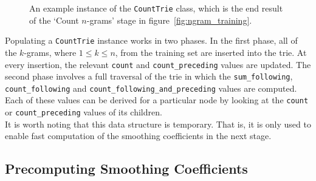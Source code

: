 \documentclass[a4paper, 12pt]{report}
\newcommand{\ttt}[1]{\texttt{#1}}
\newcommand{\tit}[1]{\textit{#1}}
\begin{document}
\begin{figure}[h]
\caption{An example instance of the \ttt{CountTrie} class, which is the end result of the `Count $n$-grams' stage in figure~\ref{fig:ngram_training}.}
\label{fig:count_trie}
\end{figure}

Populating a \ttt{CountTrie} instance works in two phases. In the first phase, all of the $k$-grams, where $1 \leq k \leq n$, from the training set are inserted into the trie. At every insertion, the relevant \ttt{count} and \ttt{count\_preceding} values are updated. The second phase involves a full traversal of the trie in which the \ttt{sum\_following}, \ttt{count\_following} and \ttt{count\_following\_and\_preceding} values are computed. Each of these values can be derived for a particular node by looking at the \ttt{count} or \ttt{count\_preceding} values of its children. \\

It is worth noting that this data structure is temporary. That is, it is only used to enable fast computation of the smoothing coefficients in the next stage.

\subsection{Precomputing Smoothing Coefficients} \label{ngram_precompute}
\end{document}

